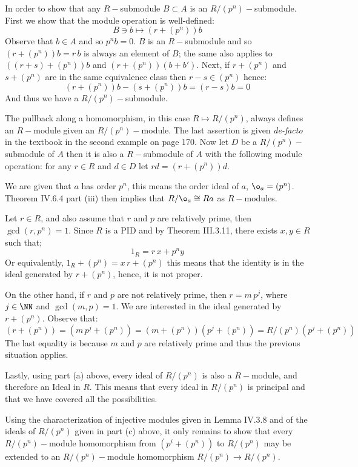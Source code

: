 In order to show that any $R-$submodule $B\subset A$ is an $R/(p^n)-$submodule. 
First we show that the module operation is well-defined:
$$B\ni b \mapsto (r+(p^n))b$$
Observe that  $b\in A$ and so $p^nb=0$. $B$  is an $R-$submodule and so $(r+(p^n) )b = r\, b$ is  always an element of $B$; the same  also applies to   $((r+s)+(p^n))b$ and $(r+(p^n) )(b+b')$.
Next, if $r+(p^n)$ and $s+(p^n) $ are in the same equivalence class then $r-s\in (p^n)$ hence:
$$(r+(p^n))b -  (s+(p^n))b= (r-s)b=0$$
And thus we have a $R/(p^n)-$submodule.

The pullback along a homomorphism, in this case $R\mapsto R/(p^n)$, always defines an $R-$module given an $R/(p^n)-$module.
The last assertion is given \textit{de-facto} in the textbook in the second example on page 170.
Now let $D$ be a $R/(p^n)-$submodule of $A$ then it is also a $R-$submodule of $A$ with the following module operation:
for any $r\in R$ and $d\in D$ let $rd= (r+(p^n))d$.

We are given that $a$ has order $p^n$, this means the order ideal of $a$, $\o_a=(p^n)$. 
Theorem IV.6.4 part (iii) then implies that $R/\o_a \cong Ra$ as $R-$modules.

Let $r\in R$, and also assume that $r$ and $p$ are relatively prime, then $\gcd(r,p^n)=1$. 
Since $R$ is a PID and by Theorem III.3.11, there exists $x,y\in R$ such that;
$$1_R = r\,x + p^ny$$
Or equivalently, $1_R + (p^n) = x\,r + (p^n)$ this means that the identity is in the ideal generated by $r+(p^n)$, hence,  it is not proper.

On the other hand, if $r$ and $p$ are not relatively prime, then $r=m\, p^j$, where $j\in \NN$ and $\gcd(m,p)=1$.
We are interested in the ideal generated by $r+(p^n)$. Observe that:
$$(r+(p^n)) = (m\,p^j+(p^n))= (m+(p^n))(p^j+(p^n))=R/(p^n)(p^j+(p^n))$$
The last equality is because $m$ and $p$ are relatively prime and thus the previous situation applies.

Lastly, using part (a) above, every ideal of $R/(p^n)$ is also a $R-$module, and therefore an Ideal in $R$. This means that every ideal in $R/(p^n)$ is principal and that we have covered all the possibilities.

Using the characterization of injective modules given in Lemma IV.3.8  and of the ideals of $R/(p^n)$ given in part (c) above, it only remains to show that every $R/(p^n)-$module homomorphism from $(p^i+(p^n))$  to $R/(p^n)$ may be extended to an $R/(p^n)-$module homomorphism $R/(p^n)\to R/(p^n)$.

